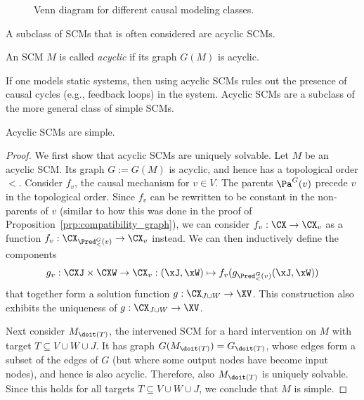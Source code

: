 \begin{figure}[t]\centering
  \caption{Venn diagram for different causal modeling classes.\label{fig:venn_diagram_scms}}
\end{figure}
A subclass of SCMs that is often considered are acyclic SCMs.
\begin{Def}
  An SCM $M$ is called \emph{acyclic} if its graph $G(M)$ is acyclic.
\end{Def}
If one models static systems, then using acyclic SCMs
rules out the presence of causal cycles (e.g., feedback loops) in the system.
Acyclic SCMs are a subclass of the more general class of simple SCMs.
\begin{Prp}
  Acyclic SCMs are simple.
\end{Prp}
\begin{proof}
  We first show that acyclic SCMs are uniquely solvable. Let $M$ be an acyclic SCM. Its
  graph $G := G(M)$ is acyclic, and hence has a topological order $<$. Consider $f_v$, the
  causal mechanism for $v \in V$. The parents $\Pa^G(v)$ precede $v$ in the topological order.
  Since $f_v$ can be rewritten to be constant in the non-parents of $v$ (similar to how this
  was done in the proof of Proposition~\ref{prp:compatibility_graph}), 
  we can consider $f_v : \CX \to \CX_v$ as a function
  $f_v : \CX_{\Pred_<^{G}(v)} \to \CX_v$ instead. We can then inductively define the components
  $$g_v : \CXJ \times \CXW \to \CX_v : 
    (\xJ,\xW) \mapsto f_v(g_{\Pred_<^{G}(v)}(\xJ,\xW))$$
  that together form a solution function $g : \CX_{J\cup W} \to \XV$.
  This construction also exhibits the uniqueness of $g : \CX_{J\cup W} \to \XV$.

  Next consider $M_{\doit(T)}$, the intervened SCM for a hard intervention on $M$ with target $T \subseteq V \cup W \cup J$. 
  It has graph $G(M_{\doit(T)}) = G_{\doit(T)}$, whose edges form a subset of the edges of $G$ (but
  where some output nodes have become input nodes), and hence is also acyclic. 
  Therefore, also $M_{\doit(T)}$ is uniquely solvable. Since this holds for all targets $T \subseteq V \cup W \cup J$,
  we conclude that $M$ is simple.
\end{proof}

